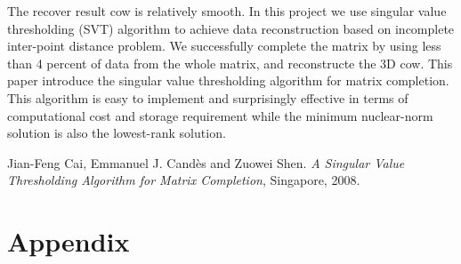 \documentclass[letter,10pt]{article}
\begin{document}
The recover result cow is relatively smooth. In this project we use singular value thresholding (SVT) algorithm to achieve data reconstruction based on incomplete inter-point distance problem. We successfully complete the matrix by using less than 4 percent of data from the whole matrix, and reconstructe the 3D cow. 
This paper introduce the singular value thresholding algorithm for matrix completion. This algorithm is easy to implement and surprisingly effective in terms of computational cost and storage requirement while the minimum nuclear-norm solution is also the lowest-rank solution.

\begin{thebibliography}{9}

Jian-Feng Cai, Emmanuel J. Cand\`{e}s and Zuowei Shen.
\textit{A Singular Value Thresholding Algorithm for Matrix Completion},
Singapore, 2008.

\end{thebibliography}





\section*{Appendix}


\end{document}
